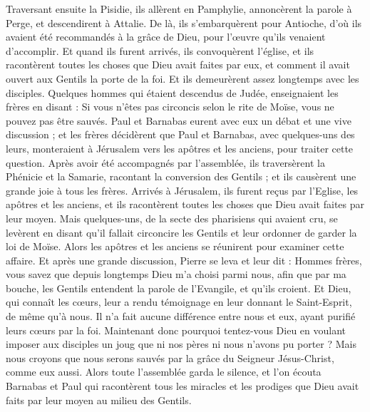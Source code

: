 \begin{multicols}{2}
{{Traversant ensuite la Pisidie, ils allèrent en Pamphylie,
annoncèrent la parole à Perge, et descendirent à Attalie.
De là, ils s'embarquèrent pour Antioche, d'où ils avaient été recommandés à la grâce de Dieu, pour l'œuvre qu'ils venaient d'accomplir.
Et quand ils furent arrivés, ils convoquèrent l'église, et ils racontèrent toutes les choses que Dieu avait faites par eux, et comment il avait ouvert aux Gentils la porte de la foi.
Et ils demeurèrent assez longtemps avec les disciples.
\VerseOne{}Quelques hommes qui étaient descendus de Judée, enseignaient les frères en disant : Si vous n'êtes pas circoncis selon le rite de Moïse, vous ne pouvez pas être sauvés.
Paul et Barnabas eurent avec eux un débat et une vive discussion ; et les frères décidèrent que Paul et Barnabas, avec quelques-uns des leurs, monteraient à Jérusalem vers les apôtres et les anciens, pour traiter cette question.
Après avoir été accompagnés par l'assemblée, ils traversèrent la Phénicie et la Samarie, racontant la conversion des Gentils ; et ils causèrent une grande joie à tous les frères.
Arrivés à Jérusalem, ils furent reçus par l'Eglise, les apôtres et les anciens, et ils racontèrent toutes les choses que Dieu avait faites par leur moyen.
Mais quelques-uns, de la secte des pharisiens qui avaient cru, se levèrent en disant qu'il fallait circoncire les Gentils et leur ordonner de garder la loi de Moïse.
Alors les apôtres et les anciens se réunirent pour examiner cette affaire.
Et après une grande discussion, Pierre se leva et leur dit : Hommes frères, vous savez que depuis longtemps Dieu m'a choisi parmi nous, afin que par ma bouche, les Gentils entendent la parole de l'Evangile, et qu'ils croient.
Et Dieu, qui connaît les cœurs, leur a rendu témoignage en leur donnant le Saint-Esprit, de même qu'à nous.
Il n'a fait aucune différence entre nous et eux, ayant purifié leurs cœurs par la foi.
Maintenant donc pourquoi tentez-vous Dieu en voulant imposer aux disciples un joug que ni nos pères ni nous n'avons pu porter ?
Mais nous croyons que nous serons sauvés par la grâce du Seigneur Jésus-Christ, comme eux aussi.
Alors toute l'assemblée garda le silence, et l'on écouta Barnabas et Paul qui racontèrent tous les miracles et les prodiges que Dieu avait faits par leur moyen au milieu des Gentils.
}}
\end{multicols}
